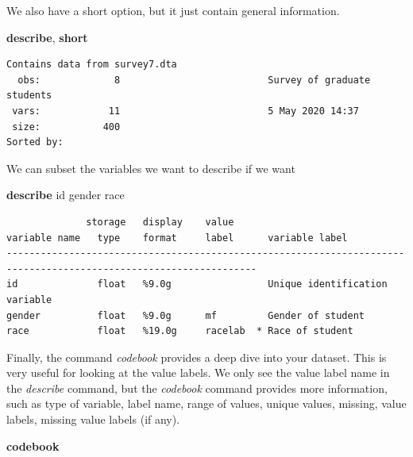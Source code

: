 \documentclass[
]{book}
\newenvironment{Shaded}{\begin{snugshade}}{\end{snugshade}}
\newcommand{\KeywordTok}[1]{\textcolor[rgb]{0.13,0.29,0.53}{\textbf{#1}}}
\newcommand{\NormalTok}[1]{#1}
\begin{document}
We also have a short option, but it just contain general information.

\begin{Shaded}
\begin{Highlighting}[]
\KeywordTok{describe}\NormalTok{, }\KeywordTok{short}
\end{Highlighting}
\end{Shaded}

\begin{verbatim}
Contains data from survey7.dta
  obs:             8                          Survey of graduate students
 vars:            11                          5 May 2020 14:37
 size:           400                          
Sorted by: 
\end{verbatim}

We can subset the variables we want to describe if we want

\begin{Shaded}
\begin{Highlighting}[]
\KeywordTok{describe}\NormalTok{ id gender race}
\end{Highlighting}
\end{Shaded}

\begin{verbatim}
              storage   display    value
variable name   type    format     label      variable label
------------------------------------------------------------------------------------------------------------------
id              float   %9.0g                 Unique identification variable
gender          float   %9.0g      mf         Gender of student
race            float   %19.0g     racelab  * Race of student
\end{verbatim}

Finally, the command \emph{codebook} provides a deep dive into your dataset. This is very useful for looking at the value labels. We only see the value label name in the \emph{describe} command, but the \emph{codebook} command provides more information, such as type of variable, label name, range of values, unique values, missing, value labels, missing value labels (if any).

\begin{Shaded}
\begin{Highlighting}[]
\KeywordTok{codebook}
\end{Highlighting}
\end{Shaded}
\end{document}
